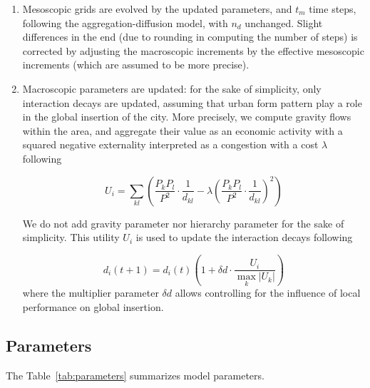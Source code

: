 \documentclass[11pt]{article}
\begin{document}
\begin{enumerate}
	\item Mesoscopic grids are evolved by the updated parameters, and $t_m$ time steps, following the aggregation-diffusion model, with $n_d$ unchanged. Slight differences in the end (due to rounding in computing the number of steps) is corrected by adjusting the macroscopic increments by the effective mesoscopic increments (which are assumed to be more precise).
	
	\item Macroscopic parameters are updated: for the sake of simplicity, only interaction decays are updated, assuming that urban form pattern play a role in the global insertion of the city. More precisely, we compute gravity flows within the area, and aggregate their value as an economic activity with a squared negative externality interpreted as a congestion with a cost $\lambda$ following
	
	\begin{equation}
		U_i = \sum_{kl} \left( \frac{P_k P_l}{P^2} \cdot \frac{1}{d_{kl}} - \lambda \left(\frac{P_k P_l}{P^2} \cdot \frac{1}{d_{kl}}\right)^2 \right)
	\end{equation}
	
	We do not add gravity parameter nor hierarchy parameter for the sake of simplicity. This utility $U_i$ is used to update the interaction decays following
	
	\begin{equation}
		d_i (t+1) = d_i (t) \left( 1 + \delta d \cdot \frac{U_i}{\max_k \left|U_k\right|} \right)
	\end{equation}
	where the multiplier parameter $\delta d$ allows controlling for the influence of local performance on global insertion.
\end{enumerate}





\subsection{Parameters}

The Table~\ref{tab:parameters} summarizes model parameters.
\end{document}
